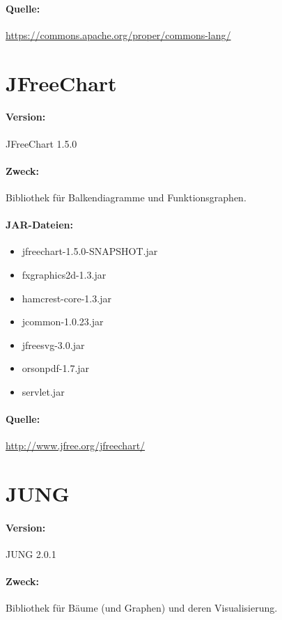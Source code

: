 \documentclass[a4paper]{report}
\begin{document}
\paragraph{Quelle:} \url{https://commons.apache.org/proper/commons-lang/}\\

\section{JFreeChart}
\paragraph{Version:} JFreeChart 1.5.0 \\
\paragraph{Zweck:} Bibliothek für Balkendiagramme und Funktionsgraphen. \\
\paragraph{JAR-Dateien:}
	\begin{itemize}
	\item jfreechart-1.5.0-SNAPSHOT.jar
	\item fxgraphics2d-1.3.jar
	\item hamcrest-core-1.3.jar
	\item jcommon-1.0.23.jar
	\item jfreesvg-3.0.jar
	\item orsonpdf-1.7.jar
	\item servlet.jar
	\end{itemize}
\paragraph{Quelle:} \url{http://www.jfree.org/jfreechart/}\\

\section{JUNG}
\paragraph{Version:} JUNG 2.0.1 \\
\paragraph{Zweck:} Bibliothek für Bäume (und Graphen) und deren Visualisierung. \\
\end{document}
